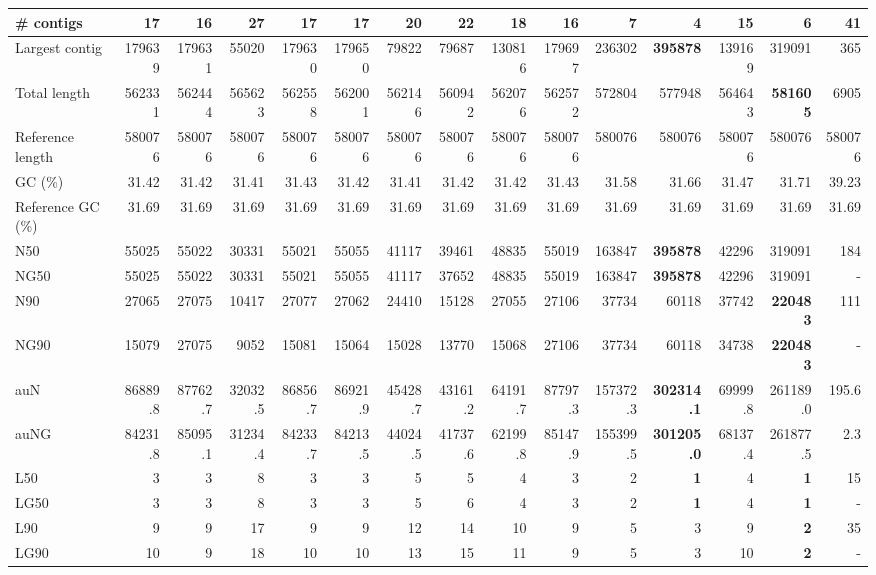 \documentclass[12pt,a4paper]{article}
\begin{document}
\begin{table}[ht]
\begin{center}
\begin{tabular}{|l*{14}{|r}|}
\# contigs & 17 & 16 & 27 & 17 & 17 & 20 & 22 & 18 & 16 & 7 & 4 & 15 & 6 & 41 \\ \hline
Largest contig & 179639 & 179631 & 55020 & 179630 & 179650 & 79822 & 79687 & 130816 & 179697 & 236302 & {\bf 395878} & 139169 & 319091 & 365 \\ \hline
Total length & 562331 & 562444 & 565623 & 562558 & 562001 & 562146 & 560942 & 562076 & 562572 & 572804 & 577948 & 564643 & {\bf 581605} & 6905 \\ \hline
Reference length & 580076 & 580076 & 580076 & 580076 & 580076 & 580076 & 580076 & 580076 & 580076 & 580076 & 580076 & 580076 & 580076 & 580076 \\ \hline
GC (\%) & 31.42 & 31.42 & 31.41 & 31.43 & 31.42 & 31.41 & 31.42 & 31.42 & 31.43 & 31.58 & 31.66 & 31.47 & 31.71 & 39.23 \\ \hline
Reference GC (\%) & 31.69 & 31.69 & 31.69 & 31.69 & 31.69 & 31.69 & 31.69 & 31.69 & 31.69 & 31.69 & 31.69 & 31.69 & 31.69 & 31.69 \\ \hline
N50 & 55025 & 55022 & 30331 & 55021 & 55055 & 41117 & 39461 & 48835 & 55019 & 163847 & {\bf 395878} & 42296 & 319091 & 184 \\ \hline
NG50 & 55025 & 55022 & 30331 & 55021 & 55055 & 41117 & 37652 & 48835 & 55019 & 163847 & {\bf 395878} & 42296 & 319091 & - \\ \hline
N90 & 27065 & 27075 & 10417 & 27077 & 27062 & 24410 & 15128 & 27055 & 27106 & 37734 & 60118 & 37742 & {\bf 220483} & 111 \\ \hline
NG90 & 15079 & 27075 & 9052 & 15081 & 15064 & 15028 & 13770 & 15068 & 27106 & 37734 & 60118 & 34738 & {\bf 220483} & - \\ \hline
auN & 86889.8 & 87762.7 & 32032.5 & 86856.7 & 86921.9 & 45428.7 & 43161.2 & 64191.7 & 87797.3 & 157372.3 & {\bf 302314.1} & 69999.8 & 261189.0 & 195.6 \\ \hline
auNG & 84231.8 & 85095.1 & 31234.4 & 84233.7 & 84213.5 & 44024.5 & 41737.6 & 62199.8 & 85147.9 & 155399.5 & {\bf 301205.0} & 68137.4 & 261877.5 & 2.3 \\ \hline
L50 & 3 & 3 & 8 & 3 & 3 & 5 & 5 & 4 & 3 & 2 & {\bf 1} & 4 & {\bf 1} & 15 \\ \hline
LG50 & 3 & 3 & 8 & 3 & 3 & 5 & 6 & 4 & 3 & 2 & {\bf 1} & 4 & {\bf 1} & - \\ \hline
L90 & 9 & 9 & 17 & 9 & 9 & 12 & 14 & 10 & 9 & 5 & 3 & 9 & {\bf 2} & 35 \\ \hline
LG90 & 10 & 9 & 18 & 10 & 10 & 13 & 15 & 11 & 9 & 5 & 3 & 10 & {\bf 2} & - \\ \hline

\end{tabular}
\end{center}
\end{table}
\end{document}
